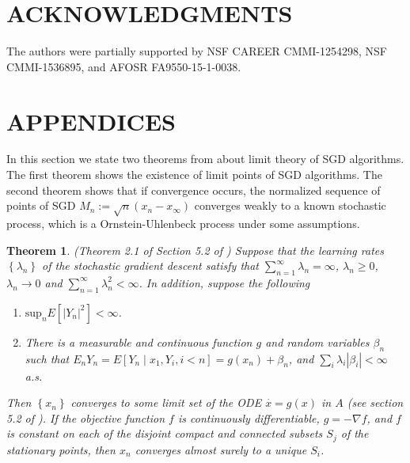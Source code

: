 \documentclass{wscpaperproc}
\theoremstyle{wsc}
\newtheorem{theorem}{Theorem}
\begin{document}
\section*{ACKNOWLEDGMENTS}
The authors were partially supported by NSF CAREER CMMI-1254298, NSF CMMI-1536895, and AFOSR FA9550-15-1-0038.

\appendix

\section{APPENDICES} 
\label{app:THEOREMS}

In this section we state two theorems from  about limit theory of SGD algorithms. The first theorem shows the existence of limit points of SGD algorithms. The second theorem shows that if convergence occurs, the normalized sequence of points of SGD $M_{n}:=\sqrt{n}\left(x_{n}-x_{\infty}\right)$ converges weakly to a known stochastic process, which is a Ornstein-Uhlenbeck process under some assumptions. 

\begin{theorem} 
(Theorem 2.1 of Section 5.2 of ) 
Suppose that the learning rates $\left\{ \lambda_{n}\right\}$ of the stochastic gradient descent satisfy that $\sum_{n=1}^{\infty}\lambda_{n}=\infty$, $\lambda_{n}\geq0$, $\lambda_{n}\rightarrow0$ and $\sum_{n=1}^{\infty}\lambda_{n}^{2}<\infty$. In addition, suppose the following

\begin{enumerate}
\item $\mbox{sup}_{n}E\left[\left|Y_{n}\right|^{2}\right]<\infty$.
\item There is a measurable and continuous function $g$ and random variables $\beta_{n}$ such that $E_{n}Y_{n}=E\left[Y_{n}\mid x_{1},Y_{i},i<n\right]=g\left(x_{n}\right)+\beta_{n}$, and $\sum_{i}\lambda_{i}\left|\beta_{i}\right|<\infty$ a.s.
\end{enumerate}

Then 
$\left\{ x_{n}\right\} $ converges to some limit set of the ODE $\overset{\cdot}{x}=g\left(x\right)$ in $A$ (see section 5.2 of ). If the objective function $f$ is continuously differentiable, $g=-\nabla f$, and $f$ is constant on each of the disjoint compact and connected subsets $S_{j}$ of the stationary points, then $x_{n}$ converges almost surely to a unique $S_{i}$.
\end{theorem}
\end{document}
